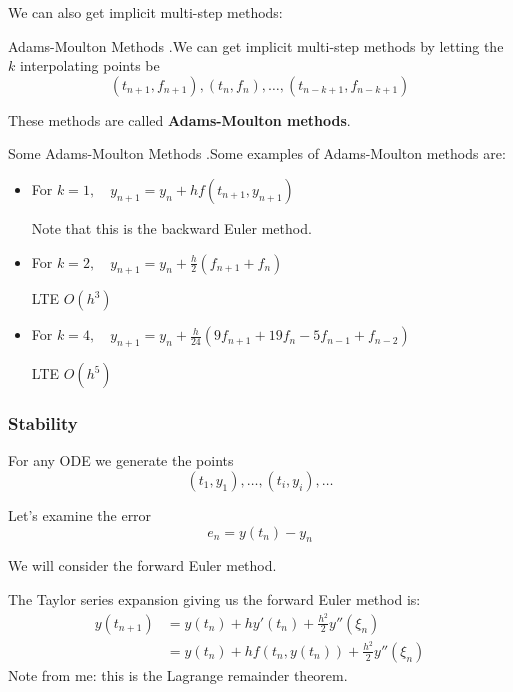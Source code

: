 \documentclass[12pt,letterpaper]{article}
\begin{document}
We can also get implicit multi-step methods:
\begin{algo}{Adams-Moulton Methods}
.We can get implicit multi-step methods by letting the $k$ interpolating points be
\begin{equation}
	(t_{n+1}, f_{n+1}), (t_n, f_n), \dots, (t_{n-k+1}, f_{n-k+1})
\end{equation}

These methods are called \textbf{Adams-Moulton methods}.
\end{algo}

\begin{algo}{Some Adams-Moulton Methods}
.Some examples of Adams-Moulton methods are:

\begin{itemize}
	\item For $k=1, \quad y_{n+1} = y_n + hf(t_{n+1}, y_{n+1})$
	
	Note that this is the backward Euler method.
	\item For $k=2, \quad y_{n+1} = y_n + \frac{h}{2} (f_{n+1} + f_n)$
	
	LTE $O(h^3)$
	\item For $k=4, \quad y_{n+1} = y_n + \frac{h}{24}(9 f_{n+1} + 19 f_n - 5f_{n-1} + f_{n-2})$
	
	LTE $O(h^5)$
\end{itemize}
\end{algo}

\subsubsection{Stability}

For any ODE we generate the points
\begin{equation}
	(t_1, y_1), \dots, (t_i, y_i), \dots
\end{equation}

Let's examine the error
\begin{equation}
	e_n = y(t_n) - y_n
\end{equation}

We will consider the forward Euler method.

The Taylor series expansion giving us the forward Euler method is:
\begin{align}
	y(t_{n+1}) &= y(t_n) + h y'(t_n) + \frac{h^2}{2} y''(\xi_n) \\
	&= y(t_n) + h f(t_n, y(t_n)) + \frac{h^2}{2} y''(\xi_n)
\end{align}
Note from me: this is the Lagrange remainder theorem.
\end{document}
